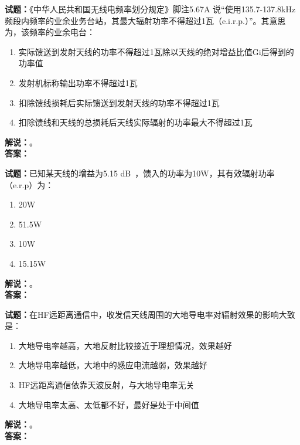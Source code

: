 \documentclass{ctexbook}
\begin{document}
\bigskip

\noindent\textbf{试题：}《中华人民共和国无线电频率划分规定》脚注5.67A 说“使用135.7-137.8\unit{\kHz}频段内频率的业余业务台站，其最大辐射功率不得超过1瓦（e.i.r.p.）”。其意思为，该频率的业余电台：
\begin{enumerate}[leftmargin=3em]
  \item 实际馈送到发射天线的功率不得超过1瓦除以天线的绝对增益比值Gi后得到的功率值
  \item 发射机标称输出功率不得超过1瓦
  \item 扣除馈线损耗后实际馈送到发射天线的功率不得超过1瓦
  \item 扣除馈线和天线的总损耗后天线实际辐射的功率最大不得超过1瓦
\end{enumerate}
\noindent\textbf{解说：}\textbf{}。\\\noindent\textbf{答案：}

\bigskip

\noindent\textbf{试题：}已知某天线的增益为5.15 \unit[qualifier-mode=combine]{\deci\bel{}}，馈入的功率为10W，其有效辐射功率（e.r.p）为：
\begin{enumerate}[leftmargin=3em]
  \item 20W
  \item 51.5W
  \item 10W
  \item 15.15W
\end{enumerate}
\noindent\textbf{解说：}\textbf{}。\\\noindent\textbf{答案：}

\bigskip

\noindent\textbf{试题：}在HF远距离通信中，收发信天线周围的大地导电率对辐射效果的影响大致是：
\begin{enumerate}[leftmargin=3em]
  \item 大地导电率越高，大地反射比较接近于理想情况，效果越好
  \item 大地导电率越低，大地中的感应电流越弱，效果越好
  \item HF远距离通信依靠天波反射，与大地导电率无关
  \item 大地导电率太高、太低都不好，最好是处于中间值
\end{enumerate}
\noindent\textbf{解说：}\textbf{}。\\\noindent\textbf{答案：}

\bigskip
\end{document}
